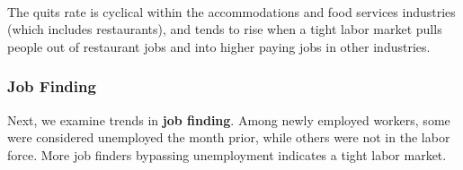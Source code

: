\begin{minipage}{0.40\textwidth}
\\
\edef\custticks{{2001-01-01}, \afticks}
\end{minipage}
\hspace{5mm}
\begin{minipage}{0.32\textwidth}
\small The quits rate is cyclical within the accommodations and food services industries (which includes restaurants), and tends to rise when a tight labor market pulls people out of restaurant jobs and into higher paying jobs in other industries.


\end{minipage}
\vspace{1mm}

\subsubsection*{Job Finding}
\vspace{-0.5mm}

\begin{minipage}{0.76\textwidth}
\small Next, we examine trends in \textbf{job finding}. Among newly employed workers, some were considered unemployed the month prior, while others were not in the labor force. More job finders bypassing unemployment indicates a tight labor market.
\end{minipage}
\vspace{0.5mm}

